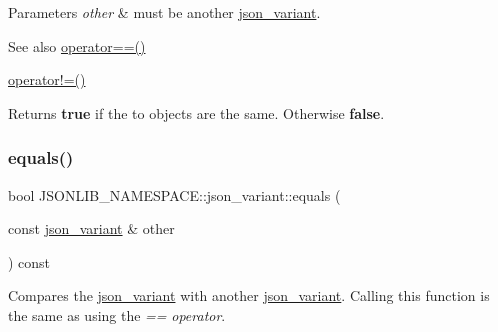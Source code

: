 \begin{DoxyParams}{Parameters}
{\em other} & must be another \hyperlink{classJSONLIB__NAMESPACE_1_1json__variant}{json\+\_\+variant}. \\
\hline
\end{DoxyParams}
\begin{DoxySeeAlso}{See also}
\hyperlink{classJSONLIB__NAMESPACE_1_1json__variant_aef1fc1a342cc170da06e0d3eb1299aad}{operator==()} 

\hyperlink{classJSONLIB__NAMESPACE_1_1json__variant_a7672a255983f3142523b3680e737d021}{operator!=()} 
\end{DoxySeeAlso}
\begin{DoxyReturn}{Returns}
{\bfseries true} if the to objects are the same. Otherwise {\bfseries false}. 
\end{DoxyReturn}
\mbox{\label{classJSONLIB__NAMESPACE_1_1json__variant_ae68b9cb156c2b2f9e12c7f889634b63a}} 
\subsubsection{\texorpdfstring{equals()}{equals()}\hspace{0.1cm}{\footnotesize\ttfamily [2/2]}}
{\footnotesize\ttfamily bool J\+S\+O\+N\+L\+I\+B\+\_\+\+N\+A\+M\+E\+S\+P\+A\+C\+E\+::json\+\_\+variant\+::equals (\begin{DoxyParamCaption}\item[{const \hyperlink{classJSONLIB__NAMESPACE_1_1json__variant}{json\+\_\+variant} \&}]{other }\end{DoxyParamCaption}) const}



Compares the \hyperlink{classJSONLIB__NAMESPACE_1_1json__variant}{json\+\_\+variant} with another \hyperlink{classJSONLIB__NAMESPACE_1_1json__variant}{json\+\_\+variant}. Calling this function is the same as using the {\itshape ==} {\itshape operator}. 


